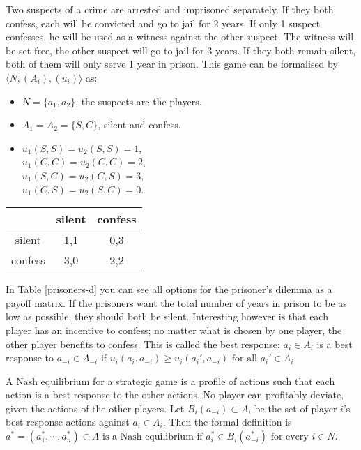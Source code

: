 Two suspects of a crime are arrested and imprisoned separately. If they both confess, each will be convicted and go to jail for 2 years. If only 1 suspect confesses, he will be used as a witness against the other suspect. The witness will be set free, the other suspect will go to jail for 3 years. If they both remain silent, both of them will only serve 1 year in prison. This game can be formalised by $\langle N, (A_i), (u_i) \rangle$ as:
\begin{itemize}
	\item $N = \{a_{1}, a_{2} \}$, the suspects are the players.
    \item $A_1 = A_2 = \{S, C\}$, silent and confess.
    \item $u_1(S, S) = u_2(S, S) = 1$, \\
    $u_1(C, C) = u_2(C, C) = 2$, \\
    $u_1(S, C) = u_2(C, S) = 3$, \\
    $u_1(C, S) = u_2(S, C) = 0$.

\end{itemize}

\begin{Float}
\centering
\begin{tabular}{|c|c|c|}
\hline
		& silent 	& confess 	\\
\hline
silent  & 1,1 		& 0,3 		\\ 
\hline
confess & 3,0 		& 2,2 		\\
\hline
\end{tabular}
\label{prisoners-d}
\end{Float}

In Table \ref{prisoners-d} you can see all options for the prisoner's dilemma as a payoff matrix. 
If the prisoners want the total number of years in prison to be as low as possible, they should both be silent. Interesting however is that each player has an incentive to confess; no matter what is chosen by one player, the other player benefits to confess. This is called the best response: $a_i \in A_i $ is a best response to $ a_{-i} \in A_{-i} $ if $u_i(a_i, a_{-i}) \geq u_i(a_{i}', a_{-i}) \mbox{ for all } a_{i}' \in A_i$.

A Nash equilibrium for a strategic game is a profile of actions such that each action is a best response to the other actions. No player can profitably deviate, given the actions of the other players. Let $B_i(a_{-i}) \subset A_i$ be the set of player $i$'s best response actions against $a_i \in A_i$. Then the formal definition is
$a^* = (a^*_1, \cdots, a^*_n) \in A \mbox{ is a Nash equilibrium if }
	a^*_i \in B_i(a_{-i}^*) \mbox{ for every } i \in N$.

